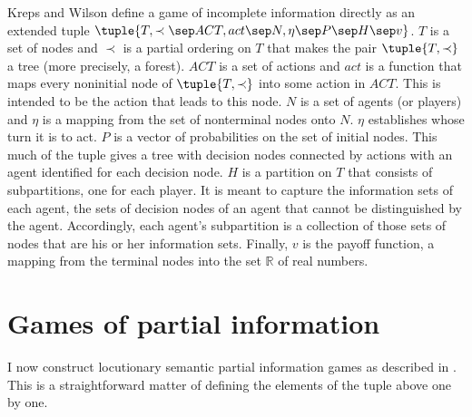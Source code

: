 
Kreps and Wilson \cite{kw:se} define a game of incomplete 
information directly as an extended tuple \hbox{$\tuple{T,\prec \sep ACT, act
\sep N,\eta \sep 
P \sep H \sep v}$}.  $T$ is a set of nodes and $\prec$ is a partial 
ordering on $T$ that makes the pair $\tuple{T,\prec}$ a tree (more
precisely, a forest). 
$ACT$ is a  set of actions and $act$ is a function that maps every
noninitial  node of 
$\tuple{T,\prec}$ into some action in $ACT$. This is intended to be the 
action that leads to this node. $N$ is a set of agents (or players) and
$\eta$  is a mapping from the set of nonterminal nodes onto $N$. $\eta$ 
establishes whose turn it is to act. $P$ is a vector of probabilities on
the  set of initial nodes. This much of the tuple gives a tree with decision
nodes  connected by actions with an agent identified for each decision
node. $H$ is  a partition on $T$ that consists of subpartitions, one for each
player. It is  meant to capture the information sets of each agent, the sets
of decision  nodes of an agent that cannot be distinguished by the agent.
Accordingly,  each agent's subpartition is a collection of those sets of
nodes that are his or her  information sets. Finally, $v$ is the payoff function,
a mapping from the  terminal nodes into the set $\mathbb{R}$ of real numbers.


\section{Games of partial information}\label{sec:A.4}

I now construct locutionary semantic partial information games as described in . This is a straightforward matter of defining the elements of the tuple above one by one.






